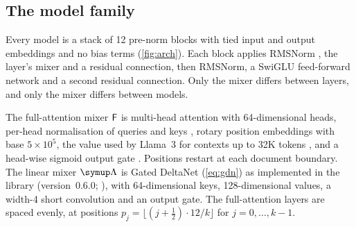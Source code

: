 \documentclass[10pt,a4paper]{article}
\begin{document}
\subsection{The model family}\label{sec:models}
Every model is a stack of 12 pre-norm blocks with tied input and output embeddings and no bias terms
(\cref{fig:arch}). Each block applies RMSNorm \citep{zhang2019rmsnorm}, the layer's mixer and a
residual connection, then RMSNorm, a SwiGLU feed-forward network \citep{shazeer2020glu} and a second
residual connection. Only the mixer differs between layers, and only the mixer differs between
models.

The full-attention mixer $\mathsf{F}$ is multi-head attention with 64-dimensional heads, per-head
normalisation of queries and keys \citep{henry2020qknorm}, rotary position embeddings with base $5\times10^5$, the value
used by Llama~3 for contexts up to 32K tokens \citep{dubey2024llama3}, and a head-wise sigmoid output
gate \citep{qiu2025gated}. Positions restart at each document boundary. The linear mixer $\Lin$ is
Gated DeltaNet (\cref{eq:gdn}) as implemented in the  library (version~0.6.0;
\citealp{fla2024}), with 64-dimensional keys, 128-dimensional values, a width-4 short convolution and
an output gate. The full-attention layers are spaced evenly, at positions
$p_j=\lfloor(j+\tfrac12)\cdot12/k\rfloor$ for $j=0,\dots,k-1$.
\end{document}

